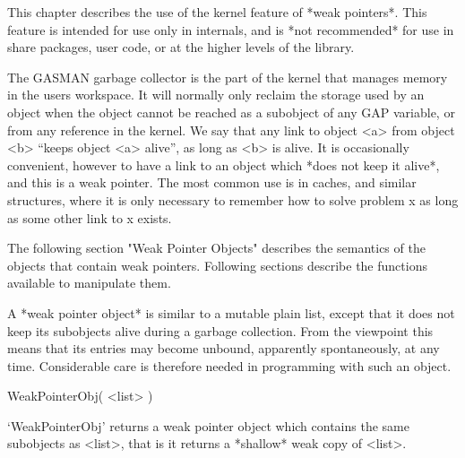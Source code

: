 

This chapter describes the use of the kernel feature of *weak pointers*. This
feature is  intended    for use only   in  {\GAP}  internals,  and  is   *not
recommended* for use in share packages, user code, or at the higher levels of
the library.

The GASMAN garbage collector is the part of the kernel that manages memory in
the users workspace.  It will  normally only reclaim  the storage used by  an
object when the object cannot be reached as a subobject  of any GAP variable,
or from any reference in the kernel.  We say that any link to object <a> from
object  <b>  ``keeps object <a>  alive'',  as long  as <b>  is  alive.  It is
occasionally convenient, however to have a link to an  object which *does not
keep   it alive*, and this  is  a weak pointer.   The  most common  use is in
caches, and similar structures, where it is only necessary to remember how to
solve problem x as long as some other link to x exists.

The  following section "Weak Pointer  Objects" describes the semantics of the
objects that contain weak pointers. Following sections describe the functions
available to manipulate them.


A  *weak pointer object* is  similar to a  mutable plain list, except that it
does  not  keep its subobjects alive   during a garbage collection.  From the
{\GAP} viewpoint this  means that its  entries may become unbound, apparently
spontaneously,  at  any   time.  Considerable care   is  therefore needed  in
programming with such an object.


\>WeakPointerObj( <list> )

`WeakPointerObj' returns  a  weak pointer object  which contains  the same
subobjects as <list>, that is it returns a *shallow* weak copy of <list>.

